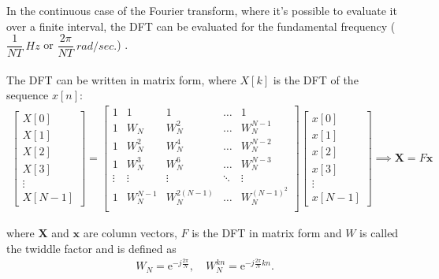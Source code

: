 In the continuous case of the Fourier transform, where it's possible to evaluate it over a finite interval, the DFT can be evaluated for the fundamental frequency ($\dfrac{1}{NT} \ Hz$ or $\dfrac{2\pi}{NT} \ rad/sec.$) \cite{DFT_OX}.
%
\\ \\
The DFT can be written in matrix form, where $X[k]$ is the DFT of the sequence $x[n]$:
\begin{align} \label{eq:DFT_matrix}
	\begin{bmatrix}
		X[0]\\ X[1]\\ X[2]\\ X[3] \\ \vdots \\ X[N-1]
	\end{bmatrix}
	=
	\begin{bmatrix}
		1 & 1 	& 1   	& \hdots & 1\\
		1 & W_N 	& W_N^2 	& \hdots & W_N^{N-1} \\
		1 & W_N^2	& W_N^4	& \hdots & W_N^{N-2} \\
		1 & W_N^3	& W_N^6	& \hdots & W_N^{N-3} \\
		\vdots & \vdots & \vdots & \ddots & \vdots \\
		1 & W_N^{N-1}	& W_N^{2(N-1)}	& \hdots & 						W_N^{(N-1)^2} \\
	\end{bmatrix}
	\begin{bmatrix}
		x[0]\\ x[1]\\ x[2]\\ x[3]\\ \vdots \\ x[N-1]
	\end{bmatrix} 
	\implies
	\textbf{X} = F\textbf{x}
\end{align}

where $\textbf{X}$ and $\textbf{x}$ are column vectors, $F$ is the DFT in matrix form and $W$ is called the twiddle factor and is defined as \cite{DFT_OX}
\begin{align*}
	W_N = \text{e}^{-j\frac{2 \pi}{N}}, \quad W_N^{kn} = \text{e}^{-j\frac{2 \pi}{N}kn}.
\end{align*}

